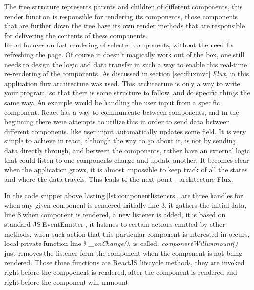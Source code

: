 The tree structure represents parents and children of different components, this render function is responsible for rendering its components, those components that are further down the tree have its own render methods that are responsible for delivering the contents of these components.
\\React focuses on fast rendering of selected components, without the need for refreshing the page. Of course it doesn't magically work out of the box, one still needs to design the logic and data transfer in such a way to enable this real-time re-rendering of the components. As discussed in section \ref{sec:fluxmvc} \emph{Flux}, in this application flux architecture was used. This architecture is only a way to write your program, so that there is some structure to follow, and do specific things the same way. An example would be handling the user input from a specific component. React has a way to communicate between components, and in the beginning there were attempts to utilize this in order to send data between different components, like user input automatically updates some field. It is very simple to achieve in react, although the way to go about it, is not by sending data directly through, and between the components, rather have an external logic that could listen to one components change and update another. It becomes clear when the application grows, it is almost impossible to keep track of all the states and where the data travels. This leads to the next point - architecture Flux.



In the code snippet above Listing \ref{lst:componentlisteners}, are three handles for when any given component is rendered initially line 3, it gathers the initial data, line 8 when component is rendered, a new listener is added, it is based on standard JS EventEmitter \cite{eventlistener}, it listenes to certain actions emitted by other methods, when such action that this particular component is interested in occurs, local private function line 9 \emph{\_onChange()}, is called. \emph{componentWillunmount()} just removes the listener form the component when the component is not being rendered.
Those three functions are ReactJS lifecycle methods, they are invoked right before the compoenent is rendered, after the component is rendered and right before the component will unmount




